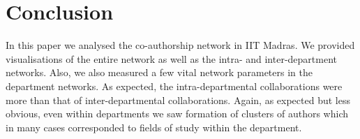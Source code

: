 \documentclass[conference,compsoc]{IEEEtran}
\begin{document}
%






\section{Conclusion}
In this paper we analysed the co-authorship network in IIT Madras. We provided visualisations of the entire network as well as the intra- and inter-department networks. Also, we also measured a few vital network parameters in the department networks. As expected, the intra-departmental collaborations were more than that of inter-departmental collaborations. Again, as expected but less obvious, even within departments we saw formation of clusters of authors which in many cases corresponded to fields of study within the department.
\end{document}
